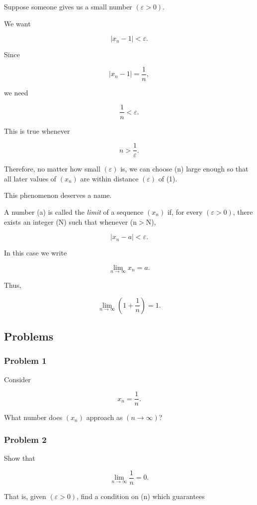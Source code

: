 Suppose someone gives us a small number $(\varepsilon>0)$.

We want

\[
|x_n-1|<\varepsilon.
\]

Since

\[
|x_n-1|=\frac{1}{n},
\]

we need

\[
\frac{1}{n}<\varepsilon.
\]

This is true whenever

\[
n>\frac{1}{\varepsilon}.
\]

Therefore, no matter how small $(\varepsilon)$ is, we can choose (n) large enough so that all later values of $(x_n)$ are within distance $(\varepsilon)$ of (1).

This phenomenon deserves a name.

\begin{definition}
A number (a) is called the \emph{limit} of a sequence $(x_n)$ if, for every
$(\varepsilon>0)$, there exists an integer (N) such that whenever (n$>$N),

\[
|x_n-a|<\varepsilon.
\]

In this case we write

\[
\lim_{n\to\infty}x_n=a.
\]
\end{definition}

Thus,

\[
\lim_{n\to\infty}\left(1+\frac{1}{n}\right)=1.
\]

\subsection{Problems}

\subsubsection*{Problem 1}

Consider

\[
x_n=\frac{1}{n}.
\]

What number does $(x_n)$ approach as $(n\to\infty)$?

\subsubsection*{Problem 2}

Show that

\[
\lim_{n\to\infty}\frac{1}{n}=0.
\]

That is, given $(\varepsilon>0)$, find a condition on (n) which guarantees

